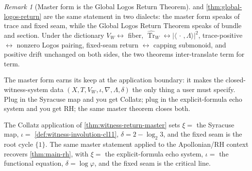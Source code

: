 \documentclass[11pt,a4paper]{article}
\theoremstyle{plain}
\theoremstyle{definition}
\theoremstyle{remark}
\newtheorem{remark}[theorem]{Remark}
\numberwithin{equation}{section}
\newcommand{\vp}{\varphi}
\DeclareMathOperator{\Tr}{Tr}
\begin{document}
\begin{remark}[Master form is the Global Logos Return Theorem]
\label{rmk:master-is-global-logos}
 and
\cref{thm:global-logos-return} are the same statement in two
dialects: the master form speaks of trace and fixed seam, while
the Global Logos Return Theorem speaks of bundle and section.
Under the dictionary
\(V_W\leftrightarrow\) fiber,
\(\widehat{\Tr}_W\leftrightarrow|\langle\,\cdot\,,\Lambda\rangle|^2\),
trace-positive \(\leftrightarrow\) nonzero Logos pairing,
fixed-seam return \(\leftrightarrow\) capping submonoid, and
positive drift unchanged on both sides, the two theorems
inter-translate term for term.

The master form earns its keep at the application boundary: it
makes the closed-witness-system data \((X,T,V_W,\iota,\nabla,
\Lambda,\delta)\) the only thing a user must specify.  Plug in
the Syracuse map and you get Collatz; plug in the explicit-formula
echo system and you get RH; the same master theorem closes both.
\end{remark}

The Collatz application of \cref{thm:witness-return-master} sets
$\xi=$ the Syracuse map, $\iota=$ \cref{def:witness-involution-cl11},
$\delta=2-\log_2 3$, and the fixed seam is the root cycle $\{1\}$.
The same master statement applied to the Apollonian/RH context
recovers \cref{thm:main-rh}, with $\xi=$ the explicit-formula
echo system, $\iota=$ the functional equation, $\delta=\log\vp$,
and the fixed seam is the critical line.
\end{document}
